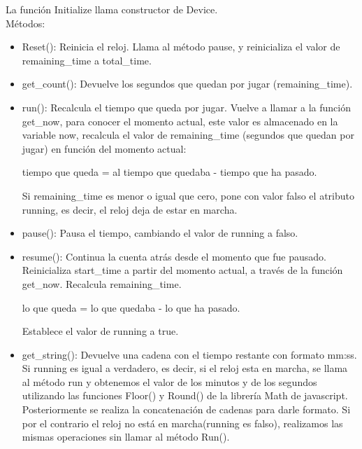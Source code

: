 La función Initialize llama constructor de Device.\\

Métodos:

\begin{itemize}
 \item Reset(): Reinicia el reloj. Llama al método pause, y reinicializa el valor de remaining\_time a total\_time.

 \item get\_count(): Devuelve los segundos que quedan por jugar (remaining\_time).

 \item run(): Recalcula el tiempo que queda por jugar. Vuelve a llamar a la función get\_now, para conocer el momento actual, este valor es almacenado 
en la variable now, recalcula el valor de remaining\_time (segundos que quedan por jugar) en función del momento actual:

        tiempo que queda = al tiempo que quedaba - tiempo que ha pasado.
        
Si remaining\_time es menor o igual que cero, pone con valor falso el atributo running, es decir, el reloj deja de estar en marcha.

 \item pause(): Pausa el tiempo, cambiando el valor de running a falso.

 \item resume(): Continua la cuenta atrás desde el momento que fue pausado. Reinicializa start\_time a partir del momento actual, a través de la 
 función get\_now. Recalcula remaining\_time.

        lo que queda = lo que quedaba - lo que ha pasado.

Establece el valor de running a true.

 \item get\_string(): Devuelve una cadena con el tiempo restante con formato mm:ss. Si running es igual a verdadero, es decir, si el reloj esta en marcha, se llama al método run y obtenemos el valor de los minutos y de los 
segundos utilizando las funciones Floor() y Round() de la librería Math de javascript. Posteriormente se realiza la concatenación de cadenas para 
darle formato. Si por el contrario el reloj no está en marcha(running es falso), realizamos las mismas operaciones sin llamar al método Run().
\end{itemize}

